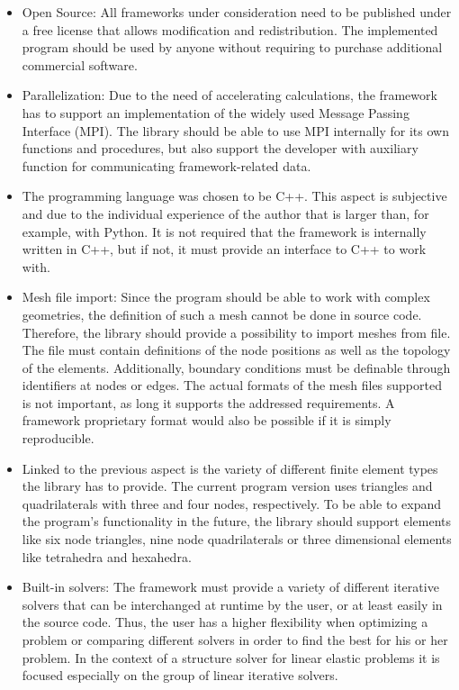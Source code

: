  \begin{itemize}
  \item Open Source: All frameworks under consideration need to be published under a free license that allows modification and redistribution. The implemented program should be used by anyone without requiring to purchase additional commercial software.
  
  \item Parallelization: Due to the need of accelerating calculations, the framework has to support an implementation of the widely used Message Passing Interface (MPI). The library should be able to use MPI internally for its own functions and procedures, but also support the developer with auxiliary function for communicating framework-related data.
 
  \item The programming language was chosen to be C++. This aspect is subjective and due to the individual experience of the author that is larger than, for example, with Python. It is not required that the framework is internally written in C++, but if not, it must provide an interface to C++ to work with.
 
  \item Mesh file import: Since the program should be able to work with complex geometries, the definition of such a mesh cannot be done in source code. Therefore, the library should provide a possibility to import meshes from file. The file must contain definitions of the node positions as well as the topology of the elements. Additionally, boundary conditions must be definable through identifiers at nodes or edges. The actual formats of the mesh files supported is not important, as long it supports the addressed requirements. A framework proprietary format would also be possible if it is simply reproducible.
  
  \item Linked to the previous aspect is the variety of different finite element types the library has to provide. The current program version uses triangles and quadrilaterals with three and four nodes, respectively. To be able to expand the program's functionality in the future, the library should support elements like six node triangles, nine node quadrilaterals or three dimensional elements like tetrahedra and hexahedra.
  
  \item Built-in solvers: The framework must provide a variety of different iterative solvers that can be interchanged at runtime by the user, or at least easily in the source code. Thus, the user has a higher flexibility when optimizing a problem or comparing different solvers in order to find the best for his or her problem. In the context of a structure solver for linear elastic problems it is focused especially on the group of linear iterative solvers.
 

\end{itemize}
